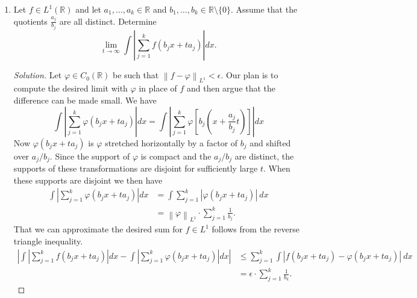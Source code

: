 \documentclass[11pt,letterpaper]{report}
\newcommand{\reals}{\mathbb{R}}
\newcommand{\Lp}[2]{\left\|{#1}\right\|_{L^{#2}}}
\newenvironment{solution}
{\begin{proof}[Solution]}
{\end{proof}}
\begin{document}
\begin{enumerate}
\begin{proof}
		we must have that one of these sets has infinite measure. We need to show that $(\mu\times \mu_L)(E) = +\infty$ too. For any $\alpha,\beta>0$ we have that if $\alpha\leq f(x)<\beta$ then the product set
		\[
		\{x: \alpha\leq f(x)<\beta\} \times \{y: 0\leq \alpha\}
		\]
		is contained in $E$. This product set has measure $\alpha\cdot \mu_L\{\alpha\leq f<\beta\}$, so by monotonicity we have that
		\[
		\alpha\cdot \mu_L\{\alpha\leq f<\beta\} \leq (\mu\times \mu_L)(E)
		\]
		for all $\alpha,\beta>0$. But by the decomposition (\ref{s16_5_main}), we have that some set of the form $\{\alpha\leq f(x)<\beta\}$ must have infinite measure, so we must have $(\mu\times \mu_L)(E) = +\infty$.
	\end{proof}

	\item Let $f\in L^1(\reals)$ and let $a_1, \ldots, a_k\in \reals$ and $b_1, \ldots, b_k\in \reals\setminus\{0\}$. Assume that the quotients $\frac{a_j}{b_j}$ are all distinct. Determine
	\[
	\lim_{t\to \infty}\int\left|\sum_{j=1}^kf(b_jx+ta_j)\right| dx.
	\]
	\begin{solution}
		Let $\varphi\in C_0(\reals)$ be such that $\Lp{f-\varphi}{1}<\epsilon$. Our plan is to compute the desired limit with $\varphi$ in place of $f$ and then argue that the difference can be made small. We have
		\[
		\int\left|\sum_{j=1}^k\varphi(b_jx+ta_j)\right| dx = \int\left|\sum_{j=1}^k\varphi\left[b_j\left(x+\frac{a_j}{b_j}t\right)\right]\right|dx
		\]
		Now $\varphi(b_jx+ta_j)$ is $\varphi$ stretched horizontally by a factor of $b_j$ and shifted over $a_j/b_j$. Since the support of $\varphi$ is compact and the $a_j/b_j$ are distinct, the supports of these transformations are disjoint for sufficiently large $t$. When these supports are disjoint we then have
		\begin{align*}
		\int\left|\sum_{j=1}^k\varphi(b_jx+ta_j)\right| dx &= \int\sum_{j=1}^k|\varphi(b_jx+ta_j)|\ dx\\
		&= \Lp{\varphi}{1}\cdot \sum_{j=1}^k\frac{1}{b_j}.
		\end{align*}
		That we can approximate the desired sum for $f\in L^1$ follows from the reverse triangle inequality.
		\begin{align*}
			\left|\int\left|\sum_{j=1}^kf(b_jx+ta_j)\right|dx - \int\left|\sum_{j=1}^k\varphi(b_jx+ta_j)\right|dx\right| &\leq \sum_{j=1}^k\int|f(b_jx+ta_j)-\varphi(b_jx+ta_j)|\ dx\\
			&= \epsilon\cdot \sum_{j=1}^k\frac{1}{b_k}.
		\end{align*}
	\end{solution}
\end{enumerate}
\end{document}
